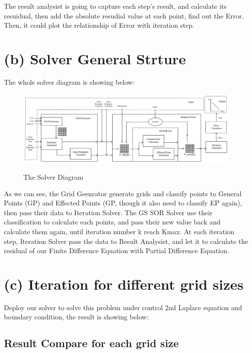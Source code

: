 \documentclass[12pt]{article}
\begin{document}
The result analysist is going to capture each step's result, and calculate its
resuidual, then add the absolute resudial value at each point, find out the Error.
Then, it could plot the relationship of Error with iteration step.







\section{(b) Solver General Strture}
The whole solver diagram is showing below:


\begin{figure}[H]
    \centering
    \includegraphics[width=1.1\textwidth]{Solver_Diagram.jpg}
    \label{Solver_Diagram.jpg}
    \caption{The Solver Diagram}
\end{figure}

As we can see, the Grid Geenrator generate grids and classify points to General Points
(GP) and Effected Points (GP, though it also need to classify EP again), then 
pass their data to Iteration Solver. The GS SOR Solver use their classification to 
calculate each points, and pass their new value back and calculate them again, 
until iteration number k reach Kmax. At each iteration step, Iteration Solver pass
the data to Result Analysist, and let it to calculate the residual of our 
Finite Difference Equation with Partial Difference Equation.



\section{(c) Iteration for different grid sizes}


Deploy our solver to solve this problem under control 2nd Laplace equation
and boundary condition, the result is showing below:

\subsection{Result Compare for each grid size}
\end{document}
